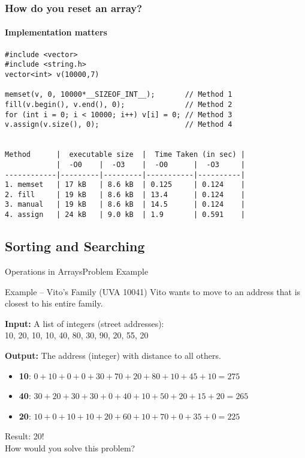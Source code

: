 \begin{frame}[fragile]
  \frametitle{How do you reset an array?}
  \framesubtitle{Implementation matters}
{\small
\begin{verbatim}
#include <vector>
#include <string.h>
vector<int> v(10000,7)

memset(v, 0, 10000*__SIZEOF_INT__);       // Method 1
fill(v.begin(), v.end(), 0);              // Method 2
for (int i = 0; i < 10000; i++) v[i] = 0; // Method 3
v.assign(v.size(), 0);                    // Method 4


Method      |  executable size  |  Time Taken (in sec) |
            |  -O0    |  -O3    |  -O0      |  -O3     |
------------|---------|---------|-----------|----------|
1. memset   | 17 kB   | 8.6 kB  | 0.125     | 0.124    |
2. fill     | 19 kB   | 8.6 kB  | 13.4      | 0.124    |
3. manual   | 19 kB   | 8.6 kB  | 14.5      | 0.124    |
4. assign   | 24 kB   | 9.0 kB  | 1.9       | 0.591    |
\end{verbatim}
}
\end{frame}

\subsection{Sorting and Searching}

\begin{frame}{Operations in Arrays}{Problem Example}

  \begin{block}{Example -- Vito's Family (UVA 10041)}
    Vito wants to move to an address that is closest to his entire family.
  \end{block}
  \bigskip

  {\bf Input:} A list of integers (street addresses):\\
  10, 20, 10, 10, 40, 80, 30, 90, 20, 55, 20
  \bigskip

  {\bf Output:} The address (integer) with  distance to all others.
  \begin{itemize}
    \item {\bf 10}: $0+10+0+0+30+70+20+80+10+45+10 = 275$
    \item {\bf 40}: $30+20+30+30+0+40+10+50+20+15+20 = 265$
    \item {\bf 20}: $10+0+10+10+20+60+10+70+0+35+0 = 225$
  \end{itemize}
  \bigskip

  Result: 20!\\
  How would you solve this problem?
\end{frame}

